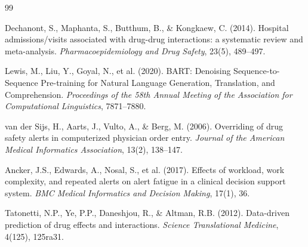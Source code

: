 \documentclass[11pt,a4paper]{article}
\begin{document}

\begin{thebibliography}{99}

Dechanont, S., Maphanta, S., Butthum, B., \& Kongkaew, C. (2014).
Hospital admissions/visits associated with drug-drug interactions: a systematic review and meta-analysis.
\textit{Pharmacoepidemiology and Drug Safety}, 23(5), 489--497.

Lewis, M., Liu, Y., Goyal, N., et al. (2020).
BART: Denoising Sequence-to-Sequence Pre-training for Natural Language Generation, Translation, and Comprehension.
\textit{Proceedings of the 58th Annual Meeting of the Association for Computational Linguistics}, 7871--7880.

van der Sijs, H., Aarts, J., Vulto, A., \& Berg, M. (2006).
Overriding of drug safety alerts in computerized physician order entry.
\textit{Journal of the American Medical Informatics Association}, 13(2), 138--147.

Ancker, J.S., Edwards, A., Nosal, S., et al. (2017).
Effects of workload, work complexity, and repeated alerts on alert fatigue in a clinical decision support system.
\textit{BMC Medical Informatics and Decision Making}, 17(1), 36.

Tatonetti, N.P., Ye, P.P., Daneshjou, R., \& Altman, R.B. (2012).
Data-driven prediction of drug effects and interactions.
\textit{Science Translational Medicine}, 4(125), 125ra31.

\end{thebibliography}
\end{document}
